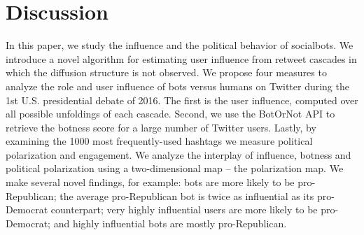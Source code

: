 
\section{Discussion}
 
In this paper, we study the influence and the political behavior of socialbots.
We introduce a novel algorithm for estimating user influence from retweet cascades in which the diffusion structure is not observed.
We propose four measures
to analyze the role and user influence of bots versus humans on Twitter during the 1st U.S. presidential debate of 2016. 
The first is the user influence, computed over all possible unfoldings of each cascade.
Second, we use the BotOrNot API to retrieve the botness score for a large number of Twitter users.
Lastly, by examining the 1000 most frequently-used hashtags we measure political polarization and engagement. 
We analyze the interplay of influence, botness and political polarization using a two-dimensional map -- the polarization map.
We make several novel findings, for example: bots are more likely to be pro-Republican; the average pro-Republican bot is twice as influential as its pro-Democrat counterpart; very highly influential users are more likely to be pro-Democrat; and highly influential bots are mostly pro-Republican.

